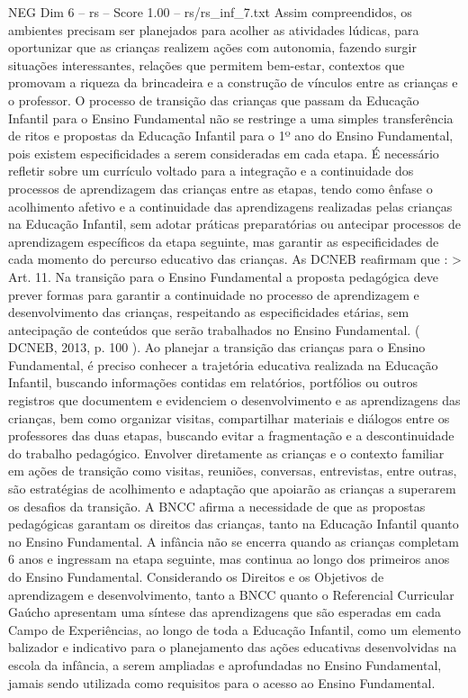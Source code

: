 \begin{textsample}{NEG Dim 6 – rs – Score 1.00 – rs/rs\_inf\_7.txt}
Assim compreendidos, os ambientes precisam ser planejados para acolher as atividades lúdicas, para oportunizar que as crianças realizem ações com autonomia, fazendo surgir situações interessantes, relações que permitem bem-estar, contextos que promovam a riqueza da brincadeira e a construção de vínculos entre as crianças e o professor.
O processo de transição das crianças que passam da Educação Infantil para o Ensino Fundamental não se restringe a uma simples transferência de ritos e propostas da Educação Infantil para o 1º ano do Ensino Fundamental, pois existem especificidades a serem consideradas em cada etapa.
É necessário refletir sobre um currículo voltado para a integração e a continuidade dos processos de aprendizagem das crianças entre as etapas, tendo como ênfase o acolhimento afetivo e a continuidade das aprendizagens realizadas pelas crianças na Educação Infantil, sem adotar práticas preparatórias ou antecipar processos de aprendizagem específicos da etapa seguinte, mas garantir as especificidades de cada momento do percurso educativo das crianças.
As DCNEB reafirmam que : > Art. 11.
Na transição para o Ensino Fundamental a proposta pedagógica deve prever formas para garantir a continuidade no processo de aprendizagem e desenvolvimento das crianças, respeitando as especificidades etárias, sem antecipação de conteúdos que serão trabalhados no Ensino Fundamental. ( DCNEB, 2013, p. 100 ).
Ao planejar a transição das crianças para o Ensino Fundamental, é preciso conhecer a trajetória educativa realizada na Educação Infantil, buscando informações contidas em relatórios, portfólios ou outros registros que documentem e evidenciem o desenvolvimento e as aprendizagens das crianças, bem como organizar visitas, compartilhar materiais e diálogos entre os professores das duas etapas, buscando evitar a fragmentação e a descontinuidade do trabalho pedagógico.
Envolver diretamente as crianças e o contexto familiar em ações de transição como visitas, reuniões, conversas, entrevistas, entre outras, são estratégias de acolhimento e adaptação que apoiarão as crianças a superarem os desafios da transição.
A BNCC afirma a necessidade de que as propostas pedagógicas garantam os direitos das crianças, tanto na Educação Infantil quanto no Ensino Fundamental.
A infância não se encerra quando as crianças completam 6 anos e ingressam na etapa seguinte, mas continua ao longo dos primeiros anos do Ensino Fundamental.
Considerando os Direitos e os Objetivos de aprendizagem e desenvolvimento, tanto a BNCC quanto o Referencial Curricular Gaúcho apresentam uma síntese das aprendizagens que são esperadas em cada Campo de Experiências, ao longo de toda a Educação Infantil, como um elemento balizador e indicativo para o planejamento das ações educativas desenvolvidas na escola da infância, a serem ampliadas e aprofundadas no Ensino Fundamental, jamais sendo utilizada como requisitos para o acesso ao Ensino Fundamental.

\end{textsample}
